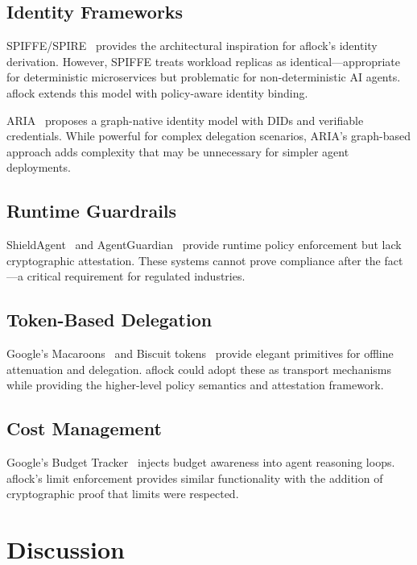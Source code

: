 \documentclass[11pt,a4paper]{article}
\begin{document}
\subsection{Identity Frameworks}

SPIFFE/SPIRE~\cite{spiffe} provides the architectural inspiration for aflock's identity derivation. However, SPIFFE treats workload replicas as identical---appropriate for deterministic microservices but problematic for non-deterministic AI agents. aflock extends this model with policy-aware identity binding.

ARIA~\cite{aria2025} proposes a graph-native identity model with DIDs and verifiable credentials. While powerful for complex delegation scenarios, ARIA's graph-based approach adds complexity that may be unnecessary for simpler agent deployments.

\subsection{Runtime Guardrails}

ShieldAgent~\cite{shieldagent2025} and AgentGuardian~\cite{agentguardian2026} provide runtime policy enforcement but lack cryptographic attestation. These systems cannot prove compliance after the fact---a critical requirement for regulated industries.

\subsection{Token-Based Delegation}

Google's Macaroons~\cite{macaroons} and Biscuit tokens~\cite{biscuit} provide elegant primitives for offline attenuation and delegation. aflock could adopt these as transport mechanisms while providing the higher-level policy semantics and attestation framework.

\subsection{Cost Management}

Google's Budget Tracker~\cite{budgettracker2025} injects budget awareness into agent reasoning loops. aflock's limit enforcement provides similar functionality with the addition of cryptographic proof that limits were respected.

\section{Discussion}
\end{document}
